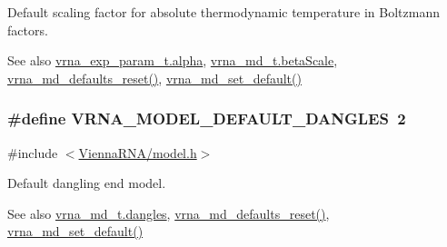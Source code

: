 Default scaling factor for absolute thermodynamic temperature in Boltzmann factors. 

\begin{DoxySeeAlso}{See also}
\hyperlink{group__energy__parameters_a77145830b7bb01b36c3217b363310ef0}{vrna\+\_\+exp\+\_\+param\+\_\+t.\+alpha}, \hyperlink{group__model__details_a19524bf1d8d7ab590ed36edbbcaaba2c}{vrna\+\_\+md\+\_\+t.\+beta\+Scale}, \hyperlink{group__model__details_ga70834424cf804d149937de89f80ceb45}{vrna\+\_\+md\+\_\+defaults\+\_\+reset()}, \hyperlink{group__model__details_ga8ac6ff84936282436f822644bf841f66}{vrna\+\_\+md\+\_\+set\+\_\+default()} 
\end{DoxySeeAlso}
\subsubsection[{\texorpdfstring{V\+R\+N\+A\+\_\+\+M\+O\+D\+E\+L\+\_\+\+D\+E\+F\+A\+U\+L\+T\+\_\+\+D\+A\+N\+G\+L\+ES}{VRNA_MODEL_DEFAULT_DANGLES}}]{\setlength{\rightskip}{0pt plus 5cm}\#define V\+R\+N\+A\+\_\+\+M\+O\+D\+E\+L\+\_\+\+D\+E\+F\+A\+U\+L\+T\+\_\+\+D\+A\+N\+G\+L\+ES~2}\hypertarget{group__model__details_ga2aa7bc2cae774b83a5c468f824c27a42}{}\label{group__model__details_ga2aa7bc2cae774b83a5c468f824c27a42}


{\ttfamily \#include $<$\hyperlink{model_8h}{Vienna\+R\+N\+A/model.\+h}$>$}



Default dangling end model. 

\begin{DoxySeeAlso}{See also}
\hyperlink{group__model__details_adcda4ff2ea77748ae0e8700288282efc}{vrna\+\_\+md\+\_\+t.\+dangles}, \hyperlink{group__model__details_ga70834424cf804d149937de89f80ceb45}{vrna\+\_\+md\+\_\+defaults\+\_\+reset()}, \hyperlink{group__model__details_ga8ac6ff84936282436f822644bf841f66}{vrna\+\_\+md\+\_\+set\+\_\+default()} 
\end{DoxySeeAlso}
